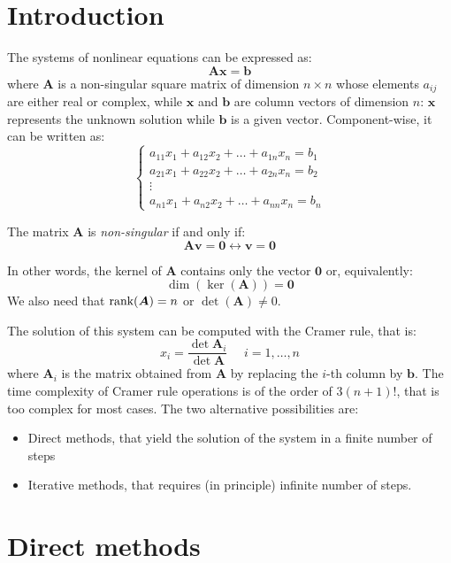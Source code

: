 \documentclass[12pt, a4paper]{report}
\begin{document}
    \section{Introduction}
    The systems of nonlinear equations can be expressed as: 
    \[\boldsymbol{Ax}=\boldsymbol{b}\]
    where $\boldsymbol{A}$ is a non-singular square matrix of dimension $n \times n$ whose elements $a_{ij}$ are either real or complex, while $\boldsymbol{x}$ and $\boldsymbol{b}$ are column vectors of dimension $n$: 
    $\boldsymbol{x}$ represents the unknown solution while $\boldsymbol{b}$ is a given vector. Component-wise, it can be written as: 
    \[
    \begin{cases}
        a_{11}x_1+a_{12}x_2+\dots+a_{1n}x_n=b_1 \\
        a_{21}x_1+a_{22}x_2+\dots+a_{2n}x_n=b_2 \\
        \vdots                                  \\
        a_{n1}x_1+a_{n2}x_2+\dots+a_{nn}x_n=b_n
    \end{cases}
    \]
    \begin{definition}
        The matrix $\boldsymbol{A}$ is \emph{non-singular} if and only if: 
        \[\boldsymbol{Av}=\boldsymbol{0}\leftrightarrow\boldsymbol{v}=\boldsymbol{0}\]
    \end{definition}
    In other words, the kernel of $\boldsymbol{A}$ contains only the vector $\boldsymbol{0}$ or, equivalently: 
    \[\dim{\left(\ker{\left(\boldsymbol{A}\right)}\right)}=\boldsymbol{0}\]
    We also need that $\textnormal{rank}(\boldsymbol{A})=n$ or $\det(\boldsymbol{A})\neq 0$. 

    The solution of this system can be computed with the Cramer rule, that is: 
    \[x_i=\dfrac{\det{\boldsymbol{A}_i}}{\det{\boldsymbol{A}}} \:\:\:\:\:\: i=1,\dots,n\]
    where $\boldsymbol{A}_i$ is the matrix obtained from $\boldsymbol{A}$ by replacing the $i$-th column by $\boldsymbol{b}$. The time 
    complexity of Cramer rule operations is of the order of $3(n+1)!$, that is too complex for most cases. 
    The two alternative possibilities are: 
    \begin{itemize}
        \item Direct methods, that yield the solution of the system in a finite number of steps
        \item Iterative methods, that requires (in principle) infinite number of steps. 
    \end{itemize}

    \section{Direct methods}
\end{document}
